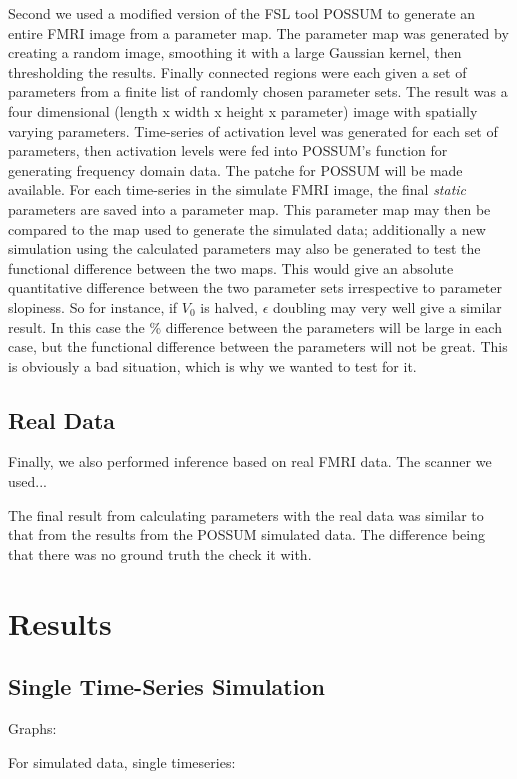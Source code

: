 \documentclass{article}
\begin{document}
Second we used a modified version of the FSL tool 
POSSUM to generate an entire FMRI image from a parameter map. The parameter map was generated
by creating a random image, smoothing it with a large Gaussian kernel, then thresholding
the results. Finally connected regions were each given a set of parameters from a finite
list of randomly chosen parameter sets. The result was a four dimensional (length x width
x height x parameter) image with spatially varying parameters. Time-series of activation level
was generated for each set of parameters, then activation levels were fed into POSSUM's 
function for generating frequency domain data. The patche for POSSUM will be made available.
For each time-series in the simulate FMRI image, the final \emph{static} parameters are saved
into a parameter map. This parameter map may then be compared to the map used to generate the 
simulated data; additionally a new simulation using the calculated parameters may also be 
generated to test the functional difference between the two maps. This would give an absolute 
quantitative difference between the two parameter sets irrespective to parameter slopiness.
So for instance, if $V_0$ is halved, $\epsilon$ doubling may very well give a similar result.
In this case the \% difference between the parameters will be large in each case, but the functional
difference between the parameters will not be great. This is obviously a bad situation, which
is why we wanted to test for it.

\subsection{Real Data}
Finally, we also performed inference based on real FMRI data. The scanner we used...

The final result from calculating parameters with the real data was similar to that
from the results from the POSSUM simulated data. The difference being that there was
no ground truth the check it with. 

\section{Results}
\subsection{Single Time-Series Simulation}

Graphs: 

For simulated data, single timeseries:
\end{document}
